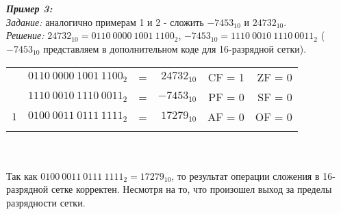 \\
\\\emph{\textbf{Пример 3:}}
\\\emph{Задание:} аналогично примерам 1 и 2 - сложить $-7453_{10}$ и $24732_{10}$.
\\\emph{Решение:} $24732_{10} = 0110\ 0000\ 1001\ 1100_{2}$, $-7453_{10} = 1110\ 0010\ 1110\ 0011_{2}$ ($-7453_{10}$ представляем в дополнительном коде для 16-разрядной сетки).
\\
\begin{minipage}[c]{10cm}
\begin{tabular}{r l c r | r r |}
\\
\hhline{~~~~--}
\multirow{2}{*}{+} & $0110\ 0000\ 1001\ 1100_{2}$ & = & $24732_{10}$ & CF = 1 & ZF = 0
\\ & $1110\ 0010\ 1110\ 0011_{2}$ & = & $-7453_{10}$ &  PF = 0 & SF = 0
\\ \hhline{--~~~}
 $1$& $0100\ 0011\ 0111\ 1111_{2}$ & = & $17279_{10}$ & AF = 0 & OF = 0
\\\hhline{~~~~--}
\end{tabular}
\end{minipage}
\\
\\Так как $0100\ 0011\ 0111\ 1111_{2} = 17279_{10}$, то результат операции сложения в 16-разрядной сетке корректен. Несмотря на то, что произошел выход за пределы разрядности сетки.